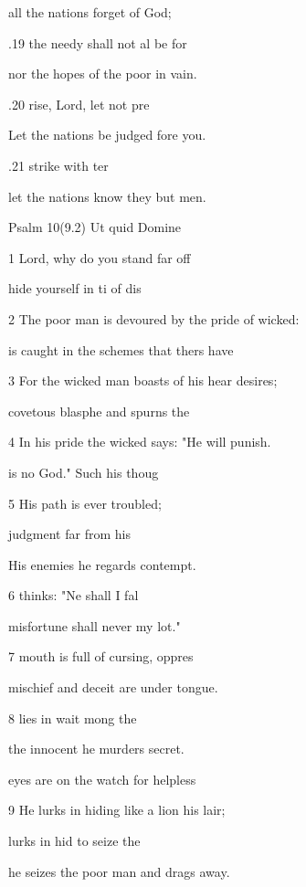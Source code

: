 all the nations forget of God; 

.19  the needy shall not al be for 

nor the hopes of the poor  in vain. 

.20 rise, Lord, let  not pre 

Let the nations be judged fore you. 

.21  strike  with ter 

let the nations know they  but men. 

Psalm 10(9.2) Ut quid Domine 


1 Lord, why do you stand far off 

 hide yourself in ti of dis 

2 The poor man is devoured by the pride of  wicked: 

 is caught in the schemes that thers have  

3 For the wicked man boasts of his hear desires; 

 covetous blasphe and spurns the  

4 In his pride the wicked says: "He will  punish. 

 is no God." Such  his thoug 

5 His path is ever troubled; 

 judgment  far from his  

His enemies he regards  contempt. 

6  thinks: "Ne shall I fal 

misfortune shall never  my lot." 

7  mouth is full of cursing,  oppres 

mischief and deceit are under  tongue. 

8  lies in wait mong the  

the innocent he murders  secret. 

 eyes are on the watch for  helpless  

9 He lurks in hiding like a lion  his lair; 

 lurks in hid to seize the  

he seizes the poor man and drags  away. 

